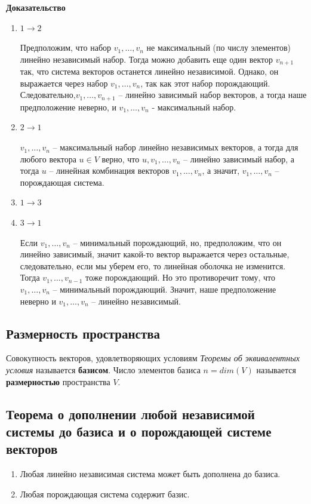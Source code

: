 \documentclass{article}
\begin{document}
\textbf{Доказательство}
\begin{enumerate}
    \item $1\to2$
    
    Предположим, что набор $v_1,\ldots,v_n$ не максимальный (по числу элементов) линейно независимый набор. Тогда можно добавить еще один вектор $v_{n+1}$ так, что система векторов останется линейно независимой. Однако, он выражается через набор $v_1,\ldots,v_n$, так как этот набор порождающий. Следовательно,$v_1,\ldots,v_{n+1}$ -- линейно зависимый набор векторов, а тогда наше предположение неверно, и $v_1,\ldots,v_n$ - максимальный набор.
    \item $2\to1$
    
    $v_1,\ldots,v_n$ -- максимальный набор линейно независимых векторов, а тогда для любого вектора $u\in V$ верно, что $u,v_1,\ldots,v_n$ -- линейно зависимый набор, а тогда $u$ -- линейная комбинация векторов $v_1,\ldots,v_n$, а значит, $v_1,\ldots,v_n$ -- порождающая система.
    \item $1\to3$
    
    
    \item $3\to1$
    
    Если $v_1,\ldots,v_n$ -- минимальный порождающий, но, предположим, что он линейно зависимый, значит какой-то вектор выражается через остальные, следовательно, если мы уберем его, то линейная оболочка не изменится. Тогда $v_1,\ldots,v_{n-1}$ тоже порождающий. Но это противоречит тому, что $v_1,\ldots,v_n$ -- минимальный порождающий. Значит, наше предположение неверно и $v_1,\ldots,v_n$ -- линейно независимый.
\end{enumerate}
\subsection{Размерность пространства}
Совокупность векторов, удовлетворяющих условиям \textit{Теоремы об эквивалентных условия} называется \textbf{базисом}. Число элементов базиса $n=dim(V)$ называется \textbf{размерностью} пространства $V$.
\subsection{Теорема о дополнении любой независимой системы до базиса и о порождающей системе векторов}
\begin{enumerate}
    \item Любая линейно независимая система может быть дополнена до базиса.
    \item Любая порождающая система содержит базис.
\end{enumerate}
\end{document}
